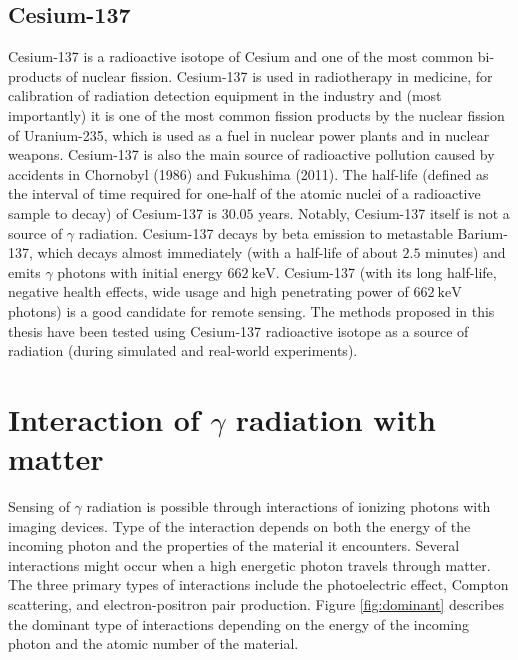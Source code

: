 \subsection{Cesium-137}
Cesium-137 is a radioactive isotope of Cesium and one of the most common bi-products of nuclear fission.
Cesium-137 is used in radiotherapy in medicine, for calibration of radiation detection equipment in the industry and 
(most importantly) it is one of the most common fission products by the nuclear fission of Uranium-235, which is used as a fuel in nuclear power plants and in nuclear weapons.
Cesium-137 is also the main source of radioactive pollution caused by accidents in Chornobyl (1986) and Fukushima (2011).
The half-life (defined as the interval of time required for one-half of the atomic nuclei of a radioactive sample to decay) of Cesium-137 is $30.05$ years.
Notably, Cesium-137 itself is not a source of $\gamma$ radiation.
Cesium-137 decays by beta emission to metastable Barium-137, which decays almost immediately (with a half-life of about $2.5$ minutes) and emits $\gamma$ photons with initial energy $\SI{662}{\kilo\electronvolt}$.
Cesium-137 (with its long half-life, negative health effects, wide usage and high penetrating power of $\SI{662}{\kilo\electronvolt}$ photons) is a good candidate for remote sensing. 
The methods proposed in this thesis have been tested using Cesium-137 radioactive isotope as a source of radiation (during simulated and real-world experiments).

\section{Interaction of $\gamma$ radiation with matter}
Sensing of $\gamma$ radiation is possible through interactions of ionizing photons with imaging devices.
Type of the interaction depends on both the energy of the incoming photon and the properties of the material it encounters. 
Several interactions might occur when a high energetic photon travels through matter.
The three primary types of interactions include the photoelectric effect, Compton scattering, and electron-positron pair production.
Figure \ref{fig:dominant} describes the dominant type of interactions depending on the energy of the incoming photon and the atomic number of the material.

